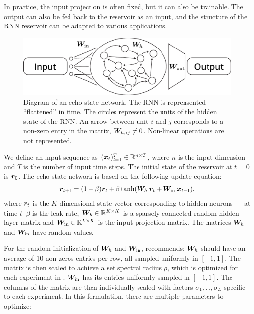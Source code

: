 In practice, the input projection is often fixed, but it can also be trainable.
The output can also be fed back to the reservoir as an input, and the
structure of the \ac{RNN} reservoir can be adapted to various applications.

\begin{figure}[htbp]
  \centering
  \includegraphics[width=.8\linewidth]{figures/echo_state_network}
  \caption{Diagram of an echo-state network. The \ac{RNN} is reprensented
    ``flattened'' in time. The circles represent the units of the hidden state
    of the \ac{RNN}. An arrow between unit $i$ and $j$ corresponds to a non-zero
    entry in the matrix, ${\bm{W}}_{h, ij} \neq 0$. Non-linear operations are not
    represented.}
  \label{fig:echo_state_network}
\end{figure}

We define an input sequence as $({\bm{x}}_{t})_{t=1}^{T} \in 
\mathbb{R}^{ n \times T}$, where $n$ is the input dimension and $T$ is the 
number of input time steps. The
initial state of the reservoir at $t = 0$ is ${\bm{r}}_{0}$. The echo-state network
is based on the following update equation:
\begin{equation}
  \label{eq:esn}
  {\bm{r}}_{t + 1} = (1 - \beta) {\bm{r}}_{t}
  +
  \beta \tanh({\bm{W}}_{h}\: {\bm{r}}_{t} + {\bm{W}}_{\text{in}}\: {\bm{x}}_{t + 1}),
\end{equation}
where ${\bm{r}}_{t}$ is the $K$-dimensional state vector corresponding to
hidden neurons --- at time $t$, $\beta$ is the leak rate,
${\bm{W}}_{h} \in \mathbb{R}^{K \times K}$ is a sparsely connected random hidden
layer matrix and ${\bm{W}}_{\text{in}} \in \mathbb{R}^{L \times K}$ is the input
projection matrix. The matrices ${\bm{W}}_{h}$ and ${\bm{W}}_{\text{in}}$ have
random values.

For the random initialization of ${\bm{W}}_{h}$ and ${\bm{W}}_{\text{in}}$,
\textcite{jaegerLongShortTermMemory2012} recommends: ${\bm{W}}_{h}$ should have an
average of 10 non-zeros entries per row, all sampled uniformly in $[-1, 1]$. The
matrix is then scaled to achieve a set spectral radius $\rho$, which is optimized
for each experiment in \parencite{jaegerLongShortTermMemory2012}.
${\bm{W}}_{\text{in}}$ has its entries uniformly sampled in $[-1, 1]$. The
columns of the matrix are then individually scaled with factors $\sigma_{1}, \ldots, \sigma_{L}$
specific to each experiment. In this formulation, there are multiple parameters
to optimize:

